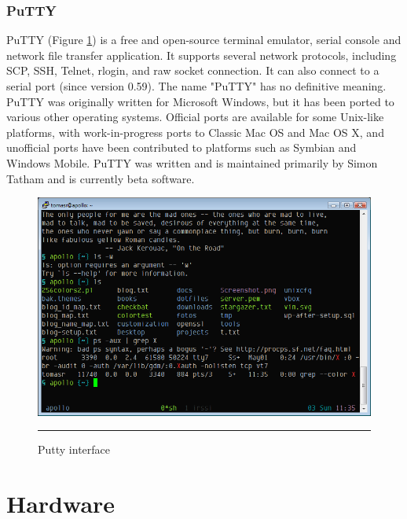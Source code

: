 \subsubsection{PuTTY}
PuTTY (Figure \ref{fig:putty}) is a free and open-source terminal emulator, serial console and network file transfer application. It supports several network protocols, including SCP, SSH, Telnet, rlogin, and raw socket connection. It can also connect to a serial port (since version 0.59). The name "PuTTY" has no definitive meaning.
PuTTY was originally written for Microsoft Windows, but it has been ported to various other operating systems. Official ports are available for some Unix-like platforms, with work-in-progress ports to Classic Mac OS and Mac OS X, and unofficial ports have been contributed to platforms such as Symbian and Windows Mobile.
PuTTY was written and is maintained primarily by Simon Tatham and is currently beta software.
\begin{figure}[h!]
	\centering
	\vspace{-0.2cm}
	\includegraphics[width=1\textwidth]{./images/putty_tango.png}
	\rule{1\textwidth}{1pt}
	\caption{Putty interface}
	\label{fig:putty}
\end{figure}


\section{Hardware}

